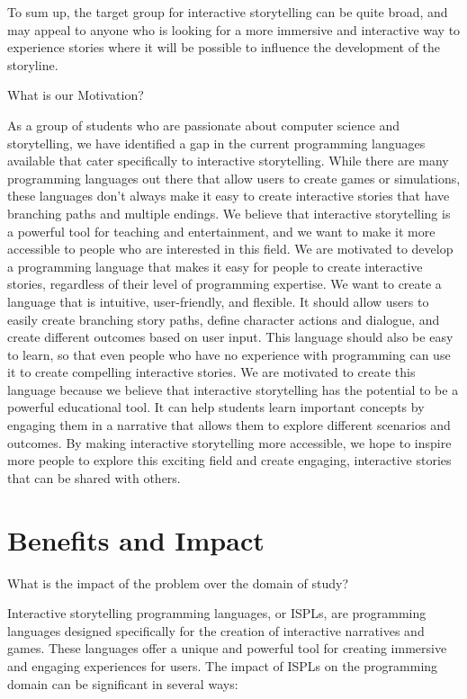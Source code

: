  To sum up, the target group for interactive storytelling can be quite broad, and may appeal to anyone who is looking for a more immersive and interactive way to experience stories where it will be possible to influence the development of the storyline.

\noindent What is our Motivation?
 
As a group of students who are passionate about computer science and storytelling, we have identified a gap in the current programming languages available that cater specifically to interactive storytelling. While there are many programming languages out there that allow users to create games or simulations, these languages don't always make it easy to create interactive stories that have branching paths and multiple endings.                                                    
We believe that interactive storytelling is a powerful tool for teaching and entertainment, and we want to make it more accessible to people who are interested in this field. We are motivated to develop a programming language that makes it easy for people to create interactive stories, regardless of their level of programming expertise.
We want to create a language that is intuitive, user-friendly, and flexible. It should allow users to easily create branching story paths, define character actions and dialogue, and create different outcomes based on user input. This language should also be easy to learn, so that even people who have no experience with programming can use it to create compelling interactive stories.
We are motivated to create this language because we believe that interactive storytelling has the potential to be a powerful educational tool. It can help students learn important concepts by engaging them in a narrative that allows them to explore different scenarios and outcomes. By making interactive storytelling more accessible, we hope to inspire more people to explore this exciting field and create engaging, interactive stories that can be shared with others.

\section*{Benefits and Impact} 

\noindent What is the impact of the problem over the domain of study?

 Interactive storytelling programming languages, or ISPLs, are programming languages designed specifically for the creation of interactive narratives and games. These languages offer a unique and powerful tool for creating immersive and engaging experiences for users. The impact of ISPLs on the programming domain can be significant in several ways:

